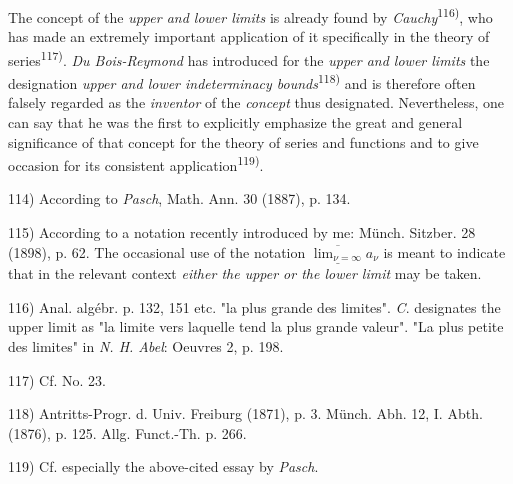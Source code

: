 The concept of the \textit{upper and lower limits} is already found by \textit{Cauchy}\textsuperscript{116)}, who has made an extremely important application of it specifically in the theory of series\textsuperscript{117)}. \textit{Du Bois-Reymond} has introduced for the \textit{upper and lower limits} the designation \textit{upper and lower indeterminacy bounds}\textsuperscript{118)} and is therefore often falsely regarded as the \textit{inventor} of the \textit{concept} thus designated. Nevertheless, one can say that he was the first to explicitly emphasize the great and general significance of that concept for the theory of series and functions and to give occasion for its consistent application\textsuperscript{119)}.

\vfill
\leftline{\rule{2in}{0.4pt}}
\vspace{0.2cm}
{
\footnotesize
114) According to \textit{Pasch}, Math. Ann. 30 (1887), p. 134.

115) According to a notation recently introduced by me: Münch. Sitzber. 28 (1898), p. 62. The occasional use of the notation $\overline{\underline{\lim_{\nu=\infty}}} a_\nu$ is meant to indicate that in the relevant context \textit{either the upper or the lower limit} may be taken.

116) Anal. algébr. p. 132, 151 etc. "la plus grande des limites". \textit{C}. designates the upper limit as "la limite vers laquelle tend la plus grande valeur". "La plus petite des limites" in \textit{N. H. Abel}: Oeuvres 2, p. 198.

117) Cf. No. 23.

118) Antritts-Progr. d. Univ. Freiburg (1871), p. 3. Münch. Abh. 12, I. Abth. (1876), p. 125. Allg. Funct.-Th. p. 266.

119) Cf. especially the above-cited essay by \textit{Pasch}.

}